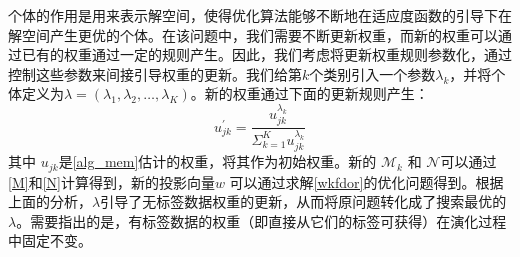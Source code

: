 个体的作用是用来表示解空间，使得优化算法能够不断地在适应度函数的引导下在解空间产生更优的个体。在该问题中，我们需要不断更新权重，而新的权重可以通过已有的权重通过一定的规则产生。因此，我们考虑将更新权重规则参数化，通过控制这些参数来间接引导权重的更新。我们给第\(k\)个类别引入一个参数\(\lambda_{k}\)，并将个体定义为\(\lambda=(\lambda_{1},\lambda_{2},\dots,\lambda_{K})\)。新的权重通过下面的更新规则产生：
\begin{equation}
\label{mem_updateRule}
u_{jk}^{'}=\frac{u_{jk}^{\lambda_{k}}}{\Sigma_{k=1}^{K} u_{jk}^{\lambda_{k}}}
\end{equation}
其中 \(u_{jk}\)是\autoref{alg_mem}估计的权重，将其作为初始权重。新的 \(\mathcal{M}_{k}\) 和 \(\mathcal{N}\)可以通过\autoref{M}和\autoref{N}计算得到，新的投影向量\(w\) 可以通过求解\autoref{wkfdor}的优化问题得到。根据上面的分析，\(\lambda\)引导了无标签数据权重的更新，从而将原问题转化成了搜索最优的\(\lambda\)。需要指出的是，有标签数据的权重（即直接从它们的标签可获得）在演化过程中固定不变。

